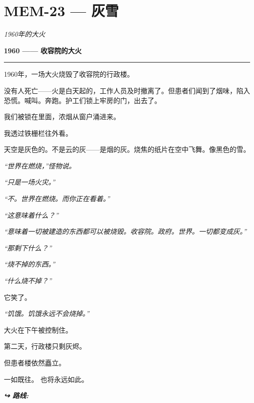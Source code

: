 \section*{\textbf{MEM-23} --- 灰雪}

\noindent \textit{1960年的大火}

\noindent \textbf{1960 —— 收容院的大火}

\vspace{0.5em}\noindent\rule{\textwidth}{0.5pt}\vspace{0.5em}

\noindent 1960年，一场大火烧毁了收容院的行政楼。

\noindent 没有人死亡——火是白天起的，工作人员及时撤离了。但患者们闻到了烟味，陷入恐慌。喊叫。奔跑。护工们锁上牢房的门，出去了。

\noindent 我们被锁在里面，浓烟从窗户涌进来。

\noindent 我透过铁栅栏往外看。

\noindent 天空是灰色的。不是云的灰——是烟的灰。烧焦的纸片在空中飞舞。像黑色的雪。

\noindent \textit{“世界在燃烧，”怪物说。}

\noindent \textit{“只是一场火灾。”}

\noindent \textit{“不。世界在燃烧。而你正在看着。”}

\noindent \textit{“这意味着什么？”}

\noindent \textit{“意味着一切被建造的东西都可以被烧毁。收容院。政府。世界。一切都变成灰。”}

\noindent \textit{“那剩下什么？”}

\noindent \textit{“烧不掉的东西。”}

\noindent \textit{“什么烧不掉？”}

\noindent 它笑了。

\noindent \textit{“饥饿。饥饿永远不会烧掉。”}

\noindent 大火在下午被控制住。

\noindent 第二天，行政楼只剩灰烬。

\noindent 但患者楼依然矗立。

\noindent 一如既往。
也将永远如此。

\vspace{0.5em}
\noindent\textit{\textbf{↪ 路线:}  \rotasep {}}
